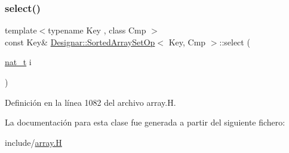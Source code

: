 \subsubsection{\texorpdfstring{select()}{select()}}
{\footnotesize\ttfamily template$<$typename Key , class Cmp $>$ \\
const Key\& \hyperlink{class_designar_1_1_sorted_array_set_op}{Designar\+::\+Sorted\+Array\+Set\+Op}$<$ Key, Cmp $>$\+::select (\begin{DoxyParamCaption}\item[{\hyperlink{namespace_designar_aa72662848b9f4815e7bf31a7cf3e33d1}{nat\+\_\+t}}]{i }\end{DoxyParamCaption})\hspace{0.3cm}{\ttfamily [inline]}}



Definición en la línea 1082 del archivo array.\+H.



La documentación para esta clase fue generada a partir del siguiente fichero\+:\begin{DoxyCompactItemize}
\item 
include/\hyperlink{array_8_h}{array.\+H}\end{DoxyCompactItemize}

